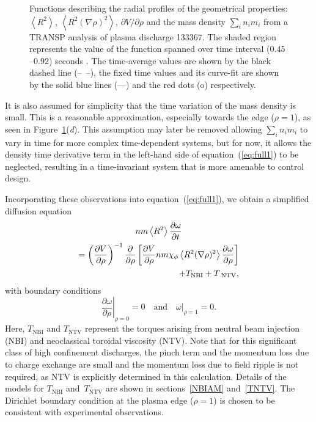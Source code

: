 \documentclass{iopart}
\begin{document}
\begin{figure}
\caption{Functions describing the radial profiles of the geometrical properties: $\left< R^2 \right>$, $\left< R^2 (\nabla\rho)^2 \right>$, $\partial V/\partial \rho$ and  the mass density $ \sum_i n_i m_i $ from a TRANSP analysis of plasma discharge 133367.  The shaded region represents the value of the function spanned over time interval ($0.45$--$0.92$) seconds . The time-average values are shown by the black dashed line (--~--), the fixed time values and its curve-fit are shown by the solid blue lines (---) and the red dots (o) respectively.}
\label{fig:geofunc}
\end{figure}

It is also assumed for simplicity that the time variation of the mass density is
small.  This is a reasonable approximation, especially towards the edge ($\rho=1$), as seen in Figure~{\ref{fig:geofunc}}(\emph{d}).
This assumption may later be removed allowing $ \sum_i n_i m_i $  to vary in
time for more complex time-dependent systems, but for now, it allows the density
time derivative term in the left-hand side of equation~(\ref{eq:full1}) to be
neglected, resulting in a time-invariant system that is more amenable to control
design.
 
 Incorporating these observations into equation~(\ref{eq:full1}), we obtain a simplified diffusion equation
\begin{multline}
 n m \left<R^2\right>
 \frac{\partial \omega}{\partial t} \\
 = \left( \frac{\partial V}{\partial\rho}\right)^{-1}
   \frac{\partial}{\partial \rho} 
   \left[\frac{\partial V}{\partial \rho} n m \chi_\phi 
   \left< R^2 (\nabla \rho)^2\right> 
   \frac{\partial\omega}{\partial\rho}\right] \\
   \hfill + T_\text{NBI} + T_\text{ NTV},
		\label{model0}
\end{multline}
with boundary conditions
\begin{equation}
\left.\frac{\partial\omega}{\partial\rho}\right|_{\rho=0} = 0 
\quad \text{and} \quad 
\left.\omega\right|_{\rho=1} = 0.
\label{bc0}
\end{equation}
Here, $T_\text{NBI} $ and $T_\text{NTV}$ represent the torques
arising from neutral beam injection (NBI) and neoclassical toroidal viscosity
(NTV). Note that for this significant class of high confinement discharges, the
pinch term and  the momentum loss due to charge exchange are small and the
momentum loss due to  field ripple is not required, as NTV is explicitly
determined in this calculation. Details of the models for $T_\text{NBI}$
and~$T_\text{NTV}$ are shown in sections~\ref{NBIAM} and~\ref{TNTV}.  The
Dirichlet boundary condition at the plasma edge ($\rho=1$) is chosen to be
consistent with experimental observations.
  
\end{document}
